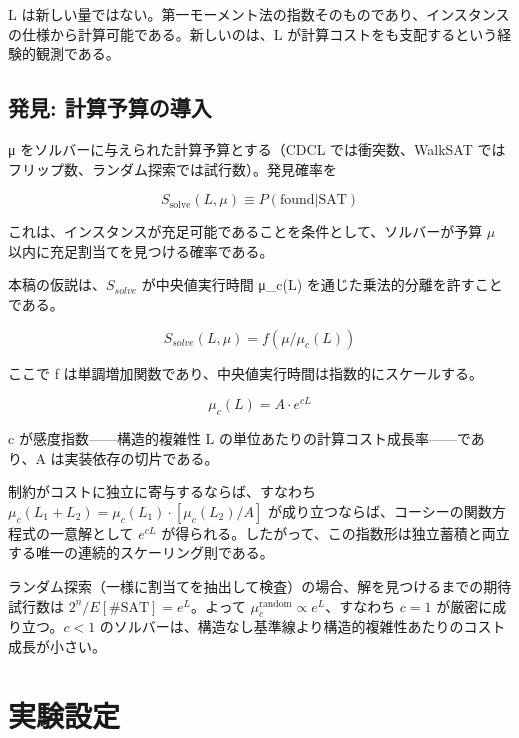\documentclass[12pt,a4paper]{article}
\begin{document}
L は新しい量ではない。第一モーメント法の指数そのものであり、インスタンスの仕様から計算可能である。新しいのは、L が計算コストをも支配するという経験的観測である。

\subsection{発見: 計算予算の導入}\label{ux767aux898b-ux8a08ux7b97ux4e88ux7b97ux306eux5c0eux5165}

μ をソルバーに与えられた計算予算とする（CDCL では衝突数、WalkSAT ではフリップ数、ランダム探索では試行数）。発見確率を

\begin{definition}
$$
S_{\text{solve}}(L, \mu) \equiv P(\text{found}|\text{SAT})
$$

これは、インスタンスが充足可能であることを条件として、ソルバーが予算 $\mu$ 以内に充足割当てを見つける確率である。
\end{definition}

本稿の仮説は、\(S_{solve}\) が中央値実行時間 μ\_c(L) を通じた乗法的分離を許すことである。

\[
S_{solve}(L, \mu) = f(\mu/\mu_{c}(L))
\]

ここで f は単調増加関数であり、中央値実行時間は指数的にスケールする。

\[
\mu_{c}(L) = A · e^{cL}
\]

c が感度指数------構造的複雑性 L の単位あたりの計算コスト成長率------であり、A は実装依存の切片である。

\begin{definition}[指数形の根拠]
制約がコストに独立に寄与するならば、すなわち $\mu_c(L_1 + L_2) = \mu_c(L_1) \cdot [\mu_c(L_2)/A]$ が成り立つならば、コーシーの関数方程式の一意解として $e^{cL}$ が得られる。したがって、この指数形は独立蓄積と両立する唯一の連続的スケーリング則である。
\end{definition}

\begin{definition}[$c = 1$ の基準線]
ランダム探索（一様に割当てを抽出して検査）の場合、解を見つけるまでの期待試行数は $2^n / E[\#\text{SAT}] = e^L$。よって $\mu_c^{\text{random}} \propto e^L$、すなわち $c = 1$ が厳密に成り立つ。$c < 1$ のソルバーは、構造なし基準線より構造的複雑性あたりのコスト成長が小さい。
\end{definition}

\section{実験設定}\label{ux5b9fux9a13ux8a2dux5b9a}
\end{document}
